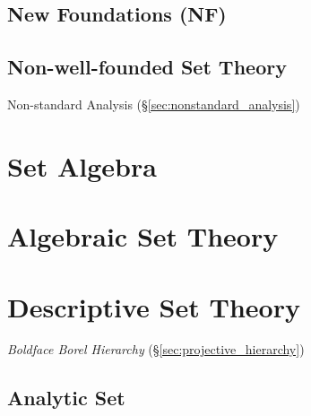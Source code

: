 \subsection{New Foundations (NF)}\label{sec:quine_foundations}

\subsection{Non-well-founded Set Theory}\label{sec:non_wellfounded}

Non-standard Analysis (\S\ref{sec:nonstandard_analysis})



\section{Set Algebra}\label{sec:set_algebra}

\section{Algebraic Set Theory}\label{sec:algebraic_set_theory}

\section{Descriptive Set Theory}\label{sec:descriptive_set_theory}

\emph{Boldface Borel Hierarchy} (\S\ref{sec:projective_hierarchy})

\subsection{Analytic Set}\label{sec:analytic_set}

